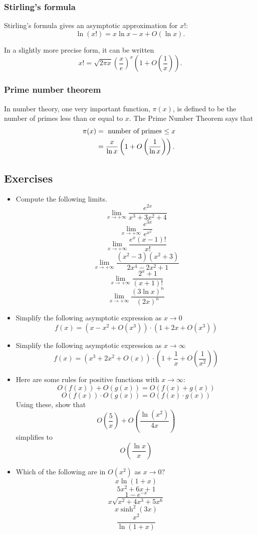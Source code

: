 \documentclass[twoside,openright,titlepage,a4paper]{book}
\begin{document}
\begin{sloppypar}
\subsubsection{Stirling's formula}

Stirling's formula gives an asymptotic approximation for $x!$: \[ \ln (x!) = x \ln x - x + O(\ln x). \]

In a slightly more precise form, it can be written \[ x! = \sqrt{2\pi x} \left(\frac{x}{e}\right)^x \left(1+O\left(\frac{1}{x}\right)\right). \]

\subsubsection{Prime number theorem}

In number theory, one very important function, $\pi(x)$, is defined to be the number of primes less than or equal to $x$. The Prime Number Theorem says that
\begin{align*}
\pi(x) &= \hbox{ number of primes $\leq x$ } \\
&= \frac{x}{\ln x} \left(1 + O\left(\frac{1}{\ln x}\right)\right).
\end{align*}

\subsection{Exercises}

\begin{itemize}
\item Compute the following limits.
\[\displaystyle \lim_{x \to +\infty} \frac{e^{2x}}{x^3 + 3x^2 +4}\]
\[\displaystyle \lim_{x \rightarrow +\infty} \frac{e^{3x}}{e^{x^2}}\]
\[\displaystyle \lim_{x \rightarrow +\infty} \frac {e^x (x-1)!}{x!}\]
\[\displaystyle \lim_{x \rightarrow +\infty} \frac {(x^2-3)(x^2+3)}{2x^4-2x^2+1}\]
\[\displaystyle \lim_{x \to +\infty} \frac{2^x + 1}{(x+1)!}\]
\[\displaystyle \lim_{x \to +\infty} \frac{(3 \ln x)^n}{(2x)^n}\]
\item Simplify the following asymptotic expression as $x\to 0$ \[ f(x) = \left( x - x^2 + O(x^3)\right)\cdot\left(1+2x + O(x^3)\right) \]
\item Simplify the following asymptotic expression as $x\to \infty$ \[ f(x) =\left( x^3 + 2x^2 + O(x)\right)\cdot\left(1+\frac{1}{x}+O\left(\frac{1}{x^2}\right)\right) \]
\item Here are some rules for positive functions with $x\to\infty$: \[ O(f(x)) + O(g(x)) = O(f(x) + g(x)) \] \[ O(f(x))\cdot O(g(x)) = O(f(x)\cdot g(x))\]
Using these, show that \[ O\left(\frac{5}{x}\right) + O\left(\frac{\ln(x^2)}{4x}\right) \] simplifies to \[ \displaystyle O\left(\frac{\ln x}{x}\right) \]
\item Which of the following are in $O(x^2)$ as $x \to 0 $? \[x \ln(1+x) \] \[ 5x^2+6x+1 \] \[1-e^{-x} \] \[ x \sqrt{x^2+4x^3+5x^6} \] \[x \sinh^2(3x) \] \[\frac{x^2}{\ln(1+x)} \]
\end{itemize}


\end{sloppypar}
\end{document}

